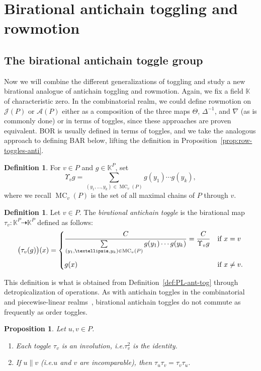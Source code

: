 \documentclass[10pt]{amsart}
\newtheorem{prop}[theo]{Proposition}
\theoremstyle{definition}
\newtheorem{defi}[theo]{Definition}
\newcommand{\ie}{i.e.}
\newcommand{\defn}[1]{\emph{#1}}
\newcommand{\kk}{\mathbb{K}}
\newcommand{\dra}{\dashrightarrow}
\newcommand{\down}{\nabla}
\newcommand{\up}{\Delta}
\DeclareMathOperator{\mc}{MC}
\newcommand{\cala}{\mathcal{A}}
\newcommand{\calj}{\mathcal{J}}
\begin{document}
\section{Birational antichain toggling and rowmotion}\label{sec:batar}
\subsection{The birational antichain toggle group}
Now we will combine the different generalizations of toggling and study a new birational analogue of antichain toggling and rowmotion.
Again, we fix a field $\kk$ of characteristic zero.
In the combinatorial realm, we could define rowmotion on $\calj(P)$ or $\cala(P)$ either as
a composition of the three maps 
$\Theta$, $\up^{-1}$, and $\down$ (as is commonly done)
or in terms of toggles, since these approaches are proven equivalent.
BOR is usually defined in terms of toggles, and we take the analogous approach to defining
BAR below, lifting the definition in 
Proposition~\ref{prop:row-toggles-anti}.

\begin{defi}
For $v\in P$ and $g\in \kk^P$, set
\[
\Upsilon_v g=
\sum\limits_{(y_1,\dots,y_k)\in \mc_v(P)} g(y_1) \cdots g(y_k),
\]
where we recall $\mc_v(P)$ is the set of all maximal chains of $P$ through $v$.
\end{defi}

\begin{defi}
Let $v\in P$. The \defn{birational antichain toggle} is the birational map $\tau_v:\kk^P \dra \kk^P$ defined as follows:
\[
\big(\tau_v(g)\big)(x) = \begin{cases}
\dfrac{C}{\sum\limits_{(y_1,\dots,y_k)\in \mc_v(P)} g(y_1) \cdots g(y_k)} = \dfrac{C}{\Upsilon_v g} &\text{if $x=v$}\\\vspace{-7 pt}\\
g(x) &\text{if $x\not=v$}.
\end{cases}
\]
\end{defi}

This definition is what is obtained from Definition~\ref{def:PL-ant-tog}
through detropicalization of operations.
As with antichain toggles in the combinatorial and piecewise-linear 
realms~\cite{strikergentog,antichain-toggling}, birational antichain toggles do not commute
as frequently as order toggles. 

\begin{prop}\label{prop:basic-tau-prop}
Let $u,v\in P$.
\begin{enumerate}[label=(\alph*)]
\item\label{prop3.3_1} Each toggle $\tau_v$ is an involution, \ie $\tau_v^2$ is the identity.
\item\label{prop3.3_2} If $u\parallel v$ (\ie $u$ and $v$ are incomparable), then $\tau_u \tau_v = \tau_v \tau_u$.
\end{enumerate}
\end{prop}
\end{document}
